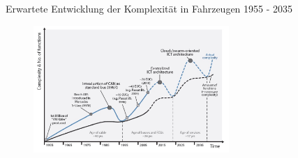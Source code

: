 \begin{frame}{Erwartete Entwicklung der Komplexität in Fahrzeugen 1955 - 2035}
    \vspace*{\fill}
    \begin{figure}[h!]
       \centering
       \includegraphics[width=0.66\textwidth,]{complexity.png}
    \end{figure}
    \vspace*{\fill}
\end{frame}